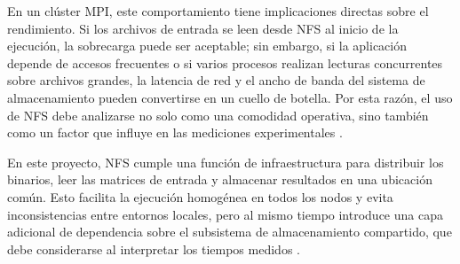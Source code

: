 En un clúster MPI, este comportamiento tiene implicaciones directas sobre el rendimiento. Si los archivos de entrada se leen desde NFS al inicio de la ejecución, la sobrecarga puede ser aceptable; sin embargo, si la aplicación depende de accesos frecuentes o si varios procesos realizan lecturas concurrentes sobre archivos grandes, la latencia de red y el ancho de banda del sistema de almacenamiento pueden convertirse en un cuello de botella. Por esta razón, el uso de NFS debe analizarse no solo como una comodidad operativa, sino también como un factor que influye en las mediciones experimentales \parencite{stone1995filesystem,terry1995session}.

En este proyecto, NFS cumple una función de infraestructura para distribuir los binarios, leer las matrices de entrada y almacenar resultados en una ubicación común. Esto facilita la ejecución homogénea en todos los nodos y evita inconsistencias entre entornos locales, pero al mismo tiempo introduce una capa adicional de dependencia sobre el subsistema de almacenamiento compartido, que debe considerarse al interpretar los tiempos medidos \parencite{sandberg1985nfs,tanenbaum2015distributed}.